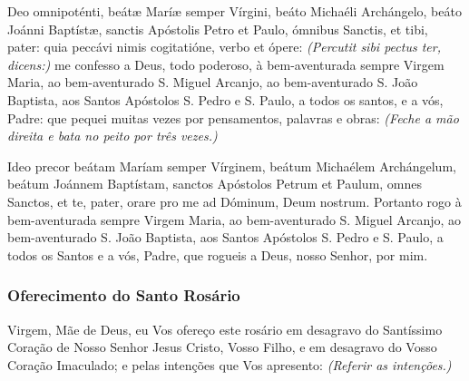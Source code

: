 \begin{paracol}{2}
Deo omnipoténti, beátæ Maríæ semper Vírgini, beáto Michaéli Archángelo, beáto Joánni Baptístæ, sanctis Apóstolis Petro et Paulo, ómnibus Sanctis, et tibi, pater: quia peccávi nimis cogitatióne, verbo et ópere: \emph{(Percutit sibi pectus ter, dicens:)}
\switchcolumn
{}me confesso a Deus, todo poderoso, à bem-aventurada sempre Virgem Maria, ao bem-aventurado S. Miguel Arcanjo, ao bem-aventurado S. João Baptista, aos Santos Apóstolos S. Pedro e S. Paulo, a todos os santos, e a vós, Padre: que pequei muitas vezes por pensamentos, palavras e obras: \emph{(Feche a mão direita e bata no peito por três vezes.)}
\switchcolumn*
\begin{nscenter}\emph{}\end{nscenter}
\switchcolumn
\begin{nscenter}\emph{}\end{nscenter}
\switchcolumn*
Ideo precor beátam Maríam semper Vírginem, beátum Michaélem Archángelum, beátum Joánnem Baptístam, sanctos Apóstolos Petrum et Paulum, omnes Sanctos, et te, pater, orare pro me ad Dóminum, Deum nostrum.
\switchcolumn
Portanto rogo à bem-aventurada sempre Virgem Maria, ao bem-aventurado S. Miguel Arcanjo, ao bem-aventurado S. João Baptista, aos Santos Apóstolos S. Pedro e S. Paulo, a todos os Santos e a vós, Padre, que rogueis a Deus, nosso Senhor, por mim.
\end{paracol}

\subsubsection{Oferecimento do Santo Rosário}

Virgem, Mãe de Deus, eu Vos ofereço este rosário em desagravo do Santíssimo Coração de Nosso Senhor Jesus Cristo, Vosso Filho, e em desagravo do Vosso Coração Imaculado; e pelas intenções que Vos apresento: \emph{(Referir as intenções.)}

\emph{}
